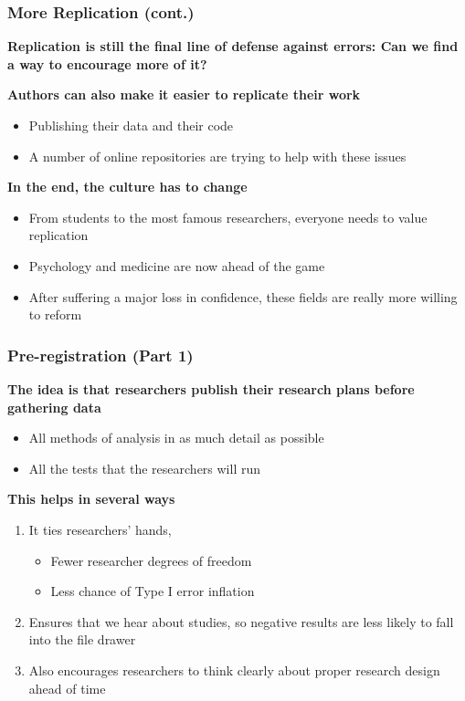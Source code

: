 \documentclass[10pt, block=fill]{beamer}
\begin{document}
 
 \begin{frame}
     \frametitle{More Replication (cont.)}
     
    {\large \textbf{Replication is still the final line of defense against errors: Can we find a way to encourage more of it?} }
    
    \vspace{0.1in}
         
    \textbf{Authors can also make it easier to replicate their work}
    \begin{itemize}
        \item Publishing their data and their code
        \item A number of online repositories are trying to help with these issues
    \end{itemize}
    
    \vspace{0.1in}
        
    \textbf{In the end, the culture has to change}
    \begin{itemize}
        \item From students to the most famous researchers, everyone needs to value replication
        \item Psychology and medicine are now ahead of the game
        \item After suffering a major loss in confidence, these fields are really more willing to reform
    \end{itemize}

\end{frame}


\begin{frame}
    \frametitle{Pre-registration (Part 1)}
    
    \textbf{The idea is that researchers publish their research plans before gathering data}
    \begin{itemize}
        \item All methods of analysis in as much detail as possible
        \item All the tests that the researchers will run
    \end{itemize}
    
    \vspace{0.25in}
    
    \textbf{This helps in several ways}
    \begin{enumerate}
        \item It ties researchers' hands, 
        \begin{itemize}
            \item Fewer researcher degrees of freedom
            \item Less chance of Type I error inflation
        \end{itemize} 
        \item Ensures that we hear about studies, so negative results are less likely to fall into the file drawer
        \item Also encourages researchers to think clearly about proper research design ahead of time
    \end{enumerate}
\end{frame}
\end{document}

